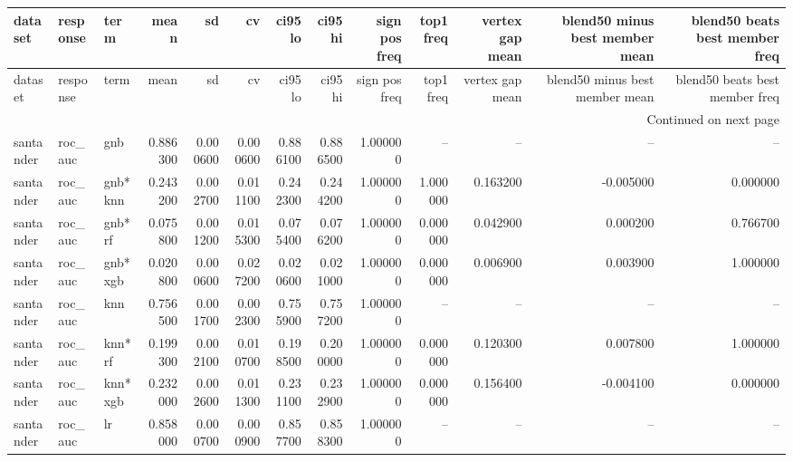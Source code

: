 \begin{landscape}
\begin{center}\label{tab:s3coef}\end{center}
\begingroup\tiny\setlength{\tabcolsep}{2.5pt}
\begin{longtable}{lllrrrrrrrrrr}
\toprule
dataset & response & term & mean & sd & cv & ci95 lo & ci95 hi & sign pos freq & top1 freq & vertex gap mean & blend50 minus best member mean & blend50 beats best member freq \\
\midrule
\endfirsthead
\toprule
dataset & response & term & mean & sd & cv & ci95 lo & ci95 hi & sign pos freq & top1 freq & vertex gap mean & blend50 minus best member mean & blend50 beats best member freq \\
\midrule
\endhead
\midrule
\multicolumn{13}{r}{Continued on next page} \\
\midrule
\endfoot
\bottomrule
\endlastfoot
santander & roc\_auc & gnb & 0.886300 & 0.000600 & 0.000600 & 0.886100 & 0.886500 & 1.000000 & -- & -- & -- & -- \\
santander & roc\_auc & gnb*knn & 0.243200 & 0.002700 & 0.011100 & 0.242300 & 0.244200 & 1.000000 & 1.000000 & 0.163200 & -0.005000 & 0.000000 \\
santander & roc\_auc & gnb*rf & 0.075800 & 0.001200 & 0.015300 & 0.075400 & 0.076200 & 1.000000 & 0.000000 & 0.042900 & 0.000200 & 0.766700 \\
santander & roc\_auc & gnb*xgb & 0.020800 & 0.000600 & 0.027200 & 0.020600 & 0.021000 & 1.000000 & 0.000000 & 0.006900 & 0.003900 & 1.000000 \\
santander & roc\_auc & knn & 0.756500 & 0.001700 & 0.002300 & 0.755900 & 0.757200 & 1.000000 & -- & -- & -- & -- \\
santander & roc\_auc & knn*rf & 0.199300 & 0.002100 & 0.010700 & 0.198500 & 0.200000 & 1.000000 & 0.000000 & 0.120300 & 0.007800 & 1.000000 \\
santander & roc\_auc & knn*xgb & 0.232000 & 0.002600 & 0.011300 & 0.231100 & 0.232900 & 1.000000 & 0.000000 & 0.156400 & -0.004100 & 0.000000 \\
santander & roc\_auc & lr & 0.858000 & 0.000700 & 0.000900 & 0.857700 & 0.858300 & 1.000000 & -- & -- & -- & -- \\

\end{longtable}
\end{landscape}
